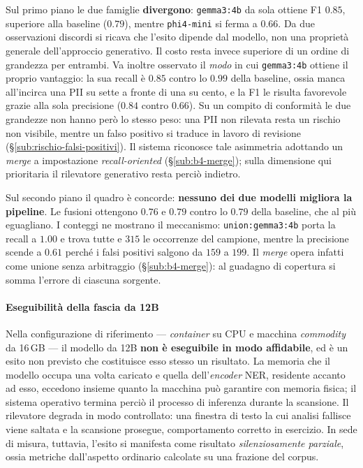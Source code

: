 Sul primo piano le due famiglie \textbf{divergono}: \texttt{gemma3:4b} da sola ottiene F1 $0.85$, superiore alla baseline ($0.79$), mentre \texttt{phi4-mini} si ferma a $0.66$. Da due osservazioni discordi si ricava che l'esito dipende dal modello, non una proprietà generale dell'approccio generativo. Il costo resta invece superiore di un ordine di grandezza per entrambi. Va inoltre osservato il \emph{modo} in cui \texttt{gemma3:4b} ottiene il proprio vantaggio: la sua recall è $0.85$ contro lo $0.99$ della baseline, ossia manca all'incirca una PII su sette a fronte di una su cento, e la F1 le risulta favorevole grazie alla sola precisione ($0.84$ contro $0.66$). Su un compito di conformità le due grandezze non hanno però lo stesso peso: una PII non rilevata resta un rischio non visibile, mentre un falso positivo si traduce in lavoro di revisione (§\ref{sub:rischio-falsi-positivi}). Il sistema riconosce tale asimmetria adottando un \emph{merge} a impostazione \textit{recall-oriented} (§\ref{sub:b4-merge}); sulla dimensione qui prioritaria il rilevatore generativo resta perciò indietro.

Sul secondo piano il quadro è concorde: \textbf{nessuno dei due modelli migliora la pipeline}. Le fusioni ottengono $0.76$ e $0.79$ contro lo $0.79$ della baseline, che al più eguagliano. I conteggi ne mostrano il meccanismo: \texttt{union:gemma3:4b} porta la recall a $1.00$ e trova tutte e $315$ le occorrenze del campione, mentre la precisione scende a $0.61$ perché i falsi positivi salgono da $159$ a $199$. Il \emph{merge} opera infatti come unione senza arbitraggio (§\ref{sub:b4-merge}): al guadagno di copertura si somma l'errore di ciascuna sorgente.

\paragraph*{Eseguibilità della fascia da 12B} Nella configurazione di riferimento --- \textit{container} su CPU e macchina \textit{commodity} da 16\,GB --- il modello da 12B \textbf{non è eseguibile in modo affidabile}, ed è un esito non previsto che costituisce esso stesso un risultato. La memoria che il modello occupa una volta caricato e quella dell'\textit{encoder} NER, residente accanto ad esso, eccedono insieme quanto la macchina può garantire con memoria fisica; il sistema operativo termina perciò il processo di inferenza durante la scansione. Il rilevatore degrada in modo controllato: una finestra di testo la cui analisi fallisce viene saltata e la scansione prosegue, comportamento corretto in esercizio. In sede di misura, tuttavia, l'esito si manifesta come risultato \emph{silenziosamente parziale}, ossia metriche dall'aspetto ordinario calcolate su una frazione del corpus.

